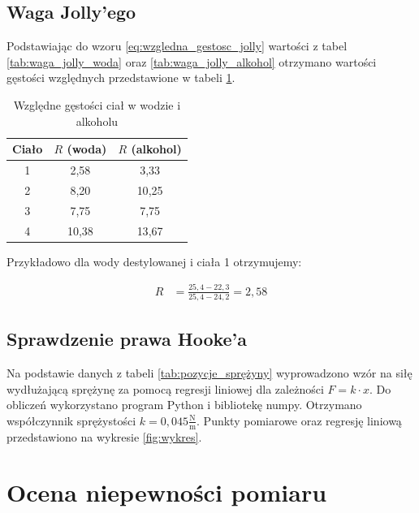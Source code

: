 \documentclass[a4paper,12pt]{article}
\begin{document}
\subsection{Waga Jolly'ego}

Podstawiając do wzoru \eqref{eq:wzgledna_gestosc_jolly} wartości z tabel \ref{tab:waga_jolly_woda} oraz \ref{tab:waga_jolly_alkohol} otrzymano wartości gęstości względnych przedstawione w tabeli \ref{tab:wzgledna_gestosc_jolly}.

\begin{table}[H]
    \centering
    \begin{tabular}{|c|c|c|}
        \hline
        \textbf{Ciało} & $R$ (woda) & $R$ (alkohol) \\
        \hline
        1 & 2{,}58 & 3{,}33 \\
        \hline
        2 & 8{,}20 & 10{,}25 \\
        \hline
        3 & 7{,}75 & 7{,}75 \\
        \hline
        4 & 10{,}38 & 13{,}67 \\
        \hline
    \end{tabular}
    \caption{Względne gęstości ciał w wodzie i alkoholu}
    \label{tab:wzgledna_gestosc_jolly}
\end{table}

Przykładowo dla wody destylowanej i ciała 1 otrzymujemy:

\begin{align*}
    R & = \frac{25{,}4 - 22{,}3}{25{,}4 - 24{,}2} = 2{,}58
\end{align*}

\subsection{Sprawdzenie prawa Hooke'a}

Na podstawie danych z tabeli \ref{tab:pozycje_sprężyny} wyprowadzono wzór na siłę wydłużającą sprężynę za pomocą regresji liniowej dla zależności $F = k \cdot x$. Do obliczeń wykorzystano program Python i bibliotekę numpy. Otrzymano współczynnik sprężystości $k = 0{,}045 \frac{\text{N}}{\text{m}}$. Punkty pomiarowe oraz regresję liniową przedstawiono na wykresie \ref{fig:wykres}.

\section{Ocena niepewności pomiaru}
\end{document}
